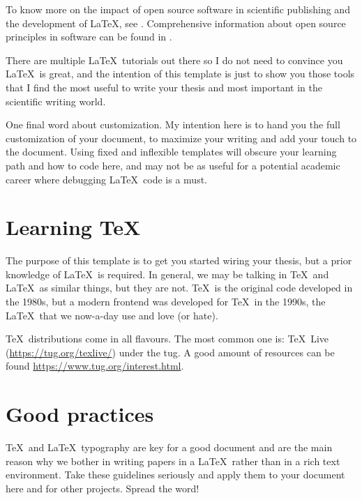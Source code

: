 To know more on the impact of open source software in scientific publishing and the development of \LaTeX, see \citet{1984texb.book.....K,1994ldps.book.....L}. Comprehensive information about open source principles in software can be found in \citet{stLaurent2004opensource}.

There are multiple \LaTeX\ tutorials out there so I do not need to convince you \LaTeX\ is great, and the intention of this template is just to show you those tools that I find the most useful to write your thesis and most important in the scientific writing world.

One final word about customization. My intention here is to hand you the full customization of your document, to maximize your writing and add your touch to the document. Using fixed and inflexible templates will obscure your learning path and how to code here, and may not be as useful for a potential academic career where debugging \LaTeX\ code is a must.

\section{Learning \TeX}
\label{sec:distributions}

The purpose of this template is to get you started wiring your thesis, but a prior knowledge of \LaTeX\ is required. In general, we may be talking in \TeX\ and \LaTeX\ as similar things, but they are not. \TeX\ is the original code developed in the 1980s, but a modern frontend was developed for \TeX\ in the 1990s, the \LaTeX\ that we now-a-day use and love (or hate).

\TeX\ distributions come in all flavours. The most common one is: \TeX\ Live (\url{https://tug.org/texlive/}) under the \gls{tug}. A good amount of resources can be found \url{https://www.tug.org/interest.html}.

\section{Good practices}

\TeX\ and \LaTeX\ typography are key for a good document and are the main reason why we bother in writing papers in a \LaTeX\ rather than in a rich text environment. Take these guidelines seriously and apply them to your document here and for other projects. Spread the word!

